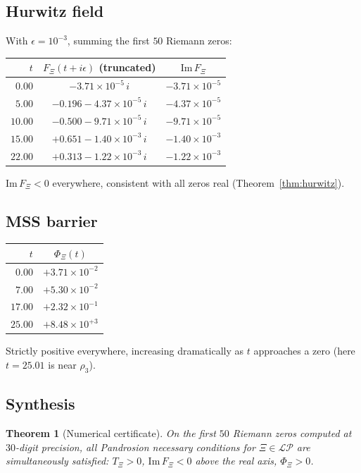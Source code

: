 \documentclass[11pt,a4paper]{article}
\newtheorem{theorem}{Theorem}[section]
\begin{document}
\subsection{Hurwitz field}
With $\epsilon = 10^{-3}$, summing the first $50$ Riemann zeros:
\begin{center}
\begin{tabular}{rcc}
\toprule
$t$ & $F_\Xi(t + i\epsilon)$ (truncated) & $\mathrm{Im}\, F_\Xi$ \\
\midrule
$0.00$  & $-3.71 \times 10^{-5}\, i$ & $-3.71 \times 10^{-5}$ \\
$5.00$  & $-0.196 -4.37 \times 10^{-5}\, i$ & $-4.37 \times 10^{-5}$ \\
$10.00$ & $-0.500 - 9.71 \times 10^{-5}\, i$ & $-9.71 \times 10^{-5}$ \\
$15.00$ & $+0.651 - 1.40 \times 10^{-3}\, i$ & $-1.40 \times 10^{-3}$ \\
$22.00$ & $+0.313 - 1.22 \times 10^{-3}\, i$ & $-1.22 \times 10^{-3}$ \\
\bottomrule
\end{tabular}
\end{center}

$\mathrm{Im}\, F_\Xi < 0$ everywhere, consistent with all zeros real
(Theorem~\ref{thm:hurwitz}).

\subsection{MSS barrier}
\begin{center}
\begin{tabular}{rc}
\toprule
$t$ & $\Phi_\Xi(t)$ \\
\midrule
$0.00$  & $+3.71 \times 10^{-2}$ \\
$7.00$  & $+5.30 \times 10^{-2}$ \\
$17.00$ & $+2.32 \times 10^{-1}$ \\
$25.00$ & $+8.48 \times 10^{+3}$ \\
\bottomrule
\end{tabular}
\end{center}

Strictly positive everywhere, increasing dramatically as $t$ approaches a
zero (here $t = 25.01$ is near $\rho_3$).

\subsection{Synthesis}

\begin{theorem}[Numerical certificate]\label{thm:numerical}
On the first $50$ Riemann zeros computed at $30$-digit precision, all
Pandrosion necessary conditions for $\Xi \in \mathcal{LP}$ are
\emph{simultaneously satisfied}: $T_\Xi > 0$, $\mathrm{Im}\, F_\Xi < 0$
above the real axis, $\Phi_\Xi > 0$.
\end{theorem}
\end{document}
